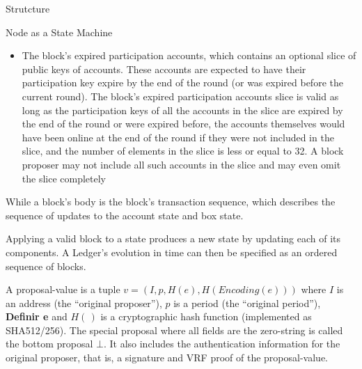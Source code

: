 \documentclass[10pt,a4paper]{article}
\begin{document}
\begin{section}{Strutcture}
\begin{subsection}{Node as a State Machine}
\begin{itemize}
    \item
    The block's expired participation accounts, which contains an optional slice
    of public keys of accounts. These accounts are expected to have their
    participation key expire by the end of the round (or was expired before
    the current round).
    The block's expired participation accounts slice is valid as long as the participation keys 
    of all the accounts in the slice are expired by the end of the round or
    were expired before, the accounts themselves would have been online at the end
    of the round if they were not included in the slice, and the number of elements
    in the slice is less or equal to 32. A block proposer may not include all such
    accounts in the slice and may even omit the slice completely
\end{itemize}
While a block's body is the block's transaction sequence, which describes the sequence
of updates to the account state and box state.
%


Applying a valid block to a state produces a new state by updating each of its components.
A Ledger's evolution in time can then be specified as an ordered sequence of blocks.

A proposal-value is a tuple $v = (I, p, H(e), H(Encoding(e)))$ where 
$I$ is an address (the ``original proposer''), 
$p$ is a period (the ``original period''), 
{\bf Definir e}
and
$H(\,)$ is a cryptographic hash function (implemented as SHA512/256). 
The special proposal where all fields are the zero-string is called the bottom 
proposal $\bot$. 
It also includes the authentication information for the original proposer, that is, 
a signature and VRF proof of the proposal-value.



\end{subsection}
\end{section}
\end{document}
